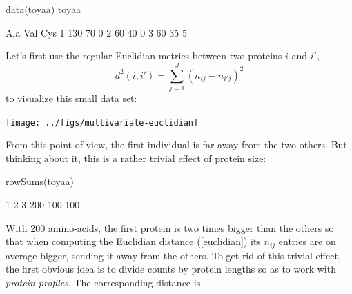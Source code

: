 \documentclass{article}
\begin{document}
\begin{Schunk}
\begin{Sinput}
 data(toyaa)
 toyaa
\end{Sinput}
\begin{Soutput}
  Ala Val Cys
1 130  70   0
2  60  40   0
3  60  35   5
\end{Soutput}
\end{Schunk}



Let's first use the regular Euclidian metrics between two proteins $i$ and $i'$,
\begin{equation}
d^2(i,i') = \sum_{j=1}^{J}(n_{ij} - n_{i'j})^2
\label{euclidian}
\end{equation}
to visualize this small data set:

\begin{Schunk}
\end{Schunk}
\texttt{[image: ../figs/multivariate-euclidian]}

From this point of view, the first individual is far away from the two others. But
thinking about it, this is a rather trivial effect of protein size:

\begin{Schunk}
\begin{Sinput}
 rowSums(toyaa)
\end{Sinput}
\begin{Soutput}
  1   2   3 
200 100 100 
\end{Soutput}
\end{Schunk}

With 200 amino-acids, the first protein is two times bigger 
than the others so that when computing the Euclidian distance (\ref{euclidian}) its $n_{ij}$ entries
are on average bigger, sending it away from the others.
To get rid of this trivial effect, the first
obvious idea is to divide counts by protein lengths so as to work with 
\emph{protein profiles}. The corresponding distance is,
\end{document}
